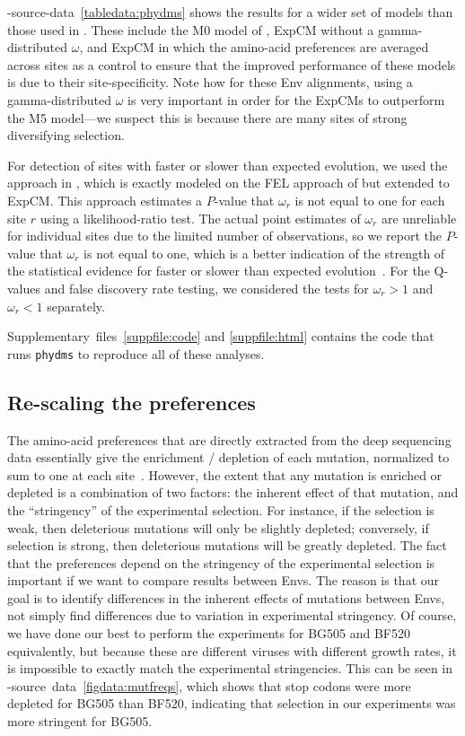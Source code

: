 \documentclass[9pt]{elife}
\begin{document}
-source-data~\ref{tabledata:phydms} shows the results for a wider set of models than those used in . 
These include the M0 model of \citet{yang2000codon}, ExpCM without a gamma-distributed $\omega$, and ExpCM in which the amino-acid preferences are averaged across sites as a control to ensure that the improved performance of these models is due to their site-specificity.
Note how for these Env alignments, using a gamma-distributed $\omega$ is very important in order for the ExpCMs to outperform the M5 model---we suspect this is because there are many sites of strong diversifying selection.

For detection of sites with faster or slower than expected evolution, we used the approach in \citet{bloom2017identification}, which is exactly modeled on the FEL approach of \citet{kosakovsky2005not} but extended to ExpCM.
This approach estimates a $P$-value that $\omega_r$ is not equal to one for each site $r$ using a likelihood-ratio test.
The actual point estimates of $\omega_r$ are unreliable for individual sites due to the limited number of observations, so we report the $P$-value that $\omega_r$ is not equal to one, which is a better indication of the strength of the statistical evidence for faster or slower than expected evolution~\citep{kosakovsky2005not,murrell2012detecting}.
For the Q-values and false discovery rate testing, we considered the tests for $\omega_r > 1$ and $\omega_r < 1$ separately.

Supplementary~files~\ref{suppfile:code} and \ref{suppfile:html} contains the code that runs \texttt{phydms} to reproduce all of these analyses.

\subsection{Re-scaling the preferences}
The amino-acid preferences that are directly extracted from the deep sequencing data essentially give the enrichment / depletion of each mutation, normalized to sum to one at each site~\cite[][\url{https://jbloomlab.github.io/dms_tools2/prefs.html}]{bloom2015software}.
However, the extent that any mutation is enriched or depleted is a combination of two factors: the inherent effect of that mutation, and the ``stringency'' of the experimental selection.
For instance, if the selection is weak, then deleterious mutations will only be slightly depleted; conversely, if selection is strong, then deleterious mutations will be greatly depleted.
The fact that the preferences depend on the stringency of the experimental selection is important if we want to compare results between Envs.
The reason is that our goal is to identify differences in the inherent effects of mutations between Envs, not simply find differences due to variation in experimental stringency.
Of course, we have done our best to perform the experiments for BG505 and BF520 equivalently, but because these are different viruses with different growth rates, it is impossible to exactly match the experimental stringencies.
This can be seen in -source~data~\ref{figdata:mutfreqs}, which shows that stop codons were more depleted for BG505 than BF520, indicating that selection in our experiments was more stringent for BG505.
\end{document}

